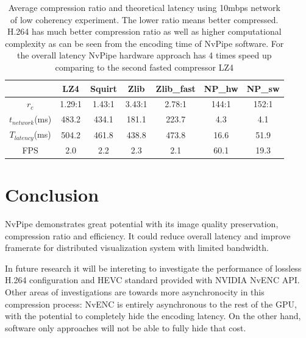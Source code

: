 \documentclass[review]{vgtc}                 %
\begin{document}
\begin{table}[htb]
  \caption{Average compression ratio and theoretical latency using 10mbps network of low coherency experiment. The lower ratio means better compressed. H.264 has much better compression ratio as well as higher computational complexity as can be seen from the encoding time of NvPipe software. For the overall latency NvPipe hardware approach has 4 times speed up comparing to the second fasted compressor LZ4}
  \label{tab:latency}
  \scriptsize
  \begin{center}
    \begin{tabular}{ccccccc}
      & LZ4 & Squirt & Zlib & Zlib\_fast & NP\_hw & NP\_sw \\
    \hline
      \(r_c\) & 1.29:1 & 1.43:1 & 3.43:1 & 2.78:1 & 144:1 & 152:1 \\
      \(t_{network}\)(ms) & 483.2 & 434.1 & 181.1 & 223.7 & 4.3 & 4.1 \\
      \(T_{latency}\)(ms) & 504.2 & 461.8 & 438.8 & 473.8 & 16.6 & 51.9 \\
      FPS & 2.0 & 2.2 & 2.3 & 2.1 & 60.1 & 19.3 
    \end{tabular}
  \end{center}
\end{table}


\section{Conclusion}


NvPipe demonstrates great potential with its image quality preservation, compression ratio and efficiency. It could reduce overall latency and improve framerate for distributed visualization system with limited bandwidth. 

In future research it will be intereting to investigate the performance of lossless H.264 configuration and HEVC standard provided with NVIDIA NvENC API. Other areas of investigations are towards more asynchronocity in this compression process: NvENC is entirely asynchronous to the rest of the GPU, with the potential to completely hide the encoding latency. On the other hand, software only approaches will not be able to fully hide that cost.




\nocite{*}

\end{document}
